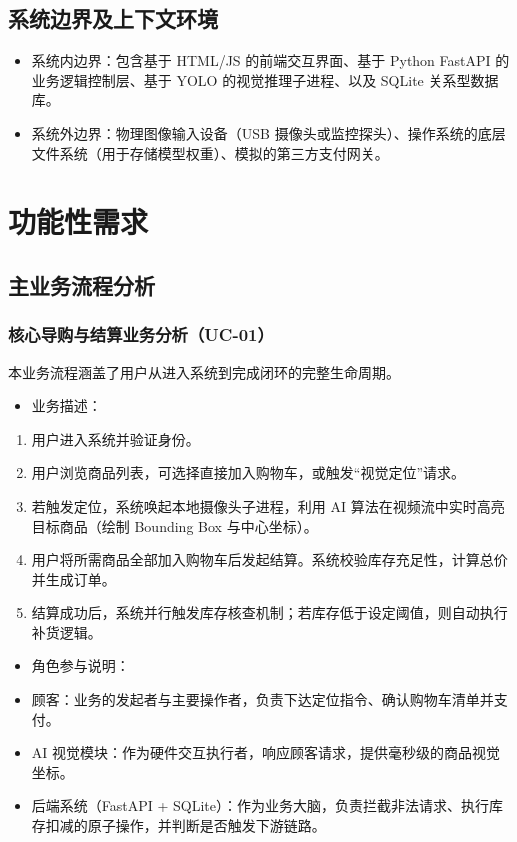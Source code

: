 \subsection{系统边界及上下文环境}
\begin{itemize}[leftmargin=2em]
  \item 系统内边界：包含基于 HTML/JS 的前端交互界面、基于 Python FastAPI 的业务逻辑控制层、基于 YOLO 的视觉推理子进程、以及 SQLite 关系型数据库。
  \item 系统外边界：物理图像输入设备（USB 摄像头或监控探头）、操作系统的底层文件系统（用于存储模型权重）、模拟的第三方支付网关。
\end{itemize}

\section{功能性需求}

\subsection{主业务流程分析}

\subsubsection{核心导购与结算业务分析（UC-01）}
本业务流程涵盖了用户从进入系统到完成闭环的完整生命周期。

\begin{itemize}[leftmargin=2em]
  \item 业务描述：
\end{itemize}
\begin{enumerate}[leftmargin=2.6em]
  \item 用户进入系统并验证身份。
  \item 用户浏览商品列表，可选择直接加入购物车，或触发“视觉定位”请求。
  \item 若触发定位，系统唤起本地摄像头子进程，利用 AI 算法在视频流中实时高亮目标商品（绘制 Bounding Box 与中心坐标）。
  \item 用户将所需商品全部加入购物车后发起结算。系统校验库存充足性，计算总价并生成订单。
  \item 结算成功后，系统并行触发库存核查机制；若库存低于设定阈值，则自动执行补货逻辑。
\end{enumerate}

\begin{itemize}[leftmargin=2em]
  \item 角色参与说明：
  \item 顾客：业务的发起者与主要操作者，负责下达定位指令、确认购物车清单并支付。
  \item AI 视觉模块：作为硬件交互执行者，响应顾客请求，提供毫秒级的商品视觉坐标。
  \item 后端系统（FastAPI + SQLite）：作为业务大脑，负责拦截非法请求、执行库存扣减的原子操作，并判断是否触发下游链路。
\end{itemize}

